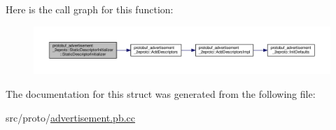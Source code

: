 Here is the call graph for this function\+:
\nopagebreak
\begin{figure}[H]
\begin{center}
\leavevmode
\includegraphics[width=350pt]{structprotobuf__advertisement__2eproto_1_1_static_descriptor_initializer_ae26c7a14b868efe8f6d183cf968d88fc_cgraph}
\end{center}
\end{figure}




The documentation for this struct was generated from the following file\+:\begin{DoxyCompactItemize}
\item 
src/proto/\hyperlink{advertisement_8pb_8cc}{advertisement.\+pb.\+cc}\end{DoxyCompactItemize}
